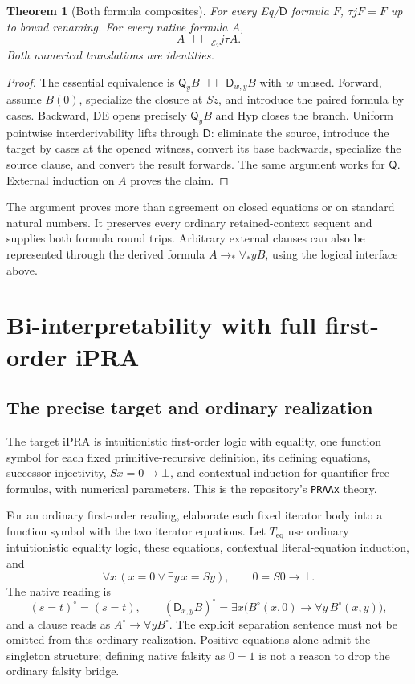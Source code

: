 \documentclass[11pt]{article}
\newtheorem{theorem}{Theorem}[section]
\theoremstyle{definition}\newtheorem{definition}[theorem]{Definition}
\newcommand{\E}{\mathcal E_2}
\newcommand{\D}{\mathsf D}
\newcommand{\Q}{\mathsf Q}
\newcommand{\Teq}{T_{\mathrm{eq}}}
\newcommand{\iffder}{\mathrel{\dashv\vdash}}
\begin{document}
\begin{theorem}[Both formula composites]
For every Eq/$\D$ formula $F$, $\tau jF=F$ up to bound renaming.
For every native formula $A$,
\[
                          A\iffder_{\E}j\tau A.
\]
Both numerical translations are identities.
\end{theorem}
\begin{proof}
The essential equivalence is
$\Q_yB\iffder\D_{w,y}B$ with $w$ unused. Forward, assume
$B(0)$, specialize the closure at $Sz$, and introduce the paired
formula by cases. Backward, DE opens precisely $\Q_yB$ and Hyp
closes the branch. Uniform pointwise interderivability lifts through
$\D$: eliminate the source, introduce the target by cases at the
opened witness, convert its base backwards, specialize the source
clause, and convert the result forwards. The same argument works
for $\Q$. External induction on $A$ proves the claim.
\end{proof}

The argument proves more than agreement on closed equations or on
standard natural numbers. It preserves every ordinary retained-context
sequent and supplies both formula round trips. Arbitrary external
clauses can also be represented through the derived formula
$A\to_*\forall_*yB$, using the logical interface above.

\section{Bi-interpretability with full first-order iPRA}
\label{sec:biinterp}

\subsection{The precise target and ordinary realization}

The target iPRA is intuitionistic first-order logic with equality,
one function symbol for each fixed primitive-recursive definition,
its defining equations, successor injectivity, $Sx=0\to\bot$,
and contextual induction for quantifier-free formulas, with numerical
parameters. This is the repository's \texttt{PRAAx} theory.

For an ordinary first-order reading, elaborate each fixed iterator
body into a function symbol with the two iterator equations. Let
$\Teq$ use ordinary intuitionistic equality logic, these equations,
contextual literal-equation induction, and
\[
 \forall x\,(x=0\lor\exists y\,x=Sy),\qquad
                         0=S0\to\bot.
\]
The native reading is
\[
 (s=t)^\circ=(s=t),\qquad
 (\D_{x,y}B)^\circ=
    \exists x\bigl(B^\circ(x,0)\to\forall y\,B^\circ(x,y)\bigr),
\]
and a clause reads as $A^\circ\to\forall yB^\circ$.
The explicit separation sentence must not be omitted from this
ordinary realization. Positive equations alone admit the singleton
structure; defining native falsity as $0=1$ is not a reason to
drop the ordinary falsity bridge.
\end{document}
